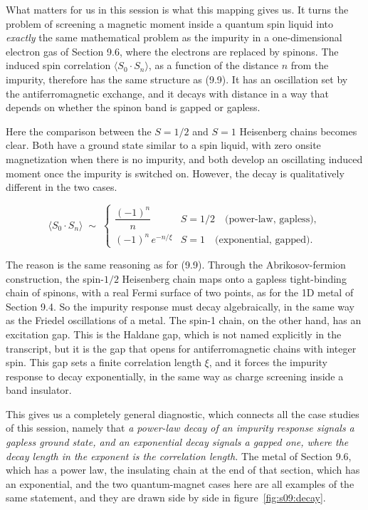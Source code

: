 What matters for us in this session is what this mapping gives us. It turns the problem of screening
a magnetic moment inside a quantum spin liquid into \emph{exactly} the same mathematical problem as
the impurity in a one-dimensional electron gas of Section 9.6, where the electrons are replaced by
spinons. The induced spin correlation $\langle S_0 \cdot S_n\rangle$, as a function of the distance
$n$ from the impurity, therefore has the same structure as (9.9). It has an oscillation set by the
antiferromagnetic exchange, and it decays with distance in a way that depends on whether the spinon
band is gapped or gapless.

Here the comparison between the $S=1/2$ and $S=1$ Heisenberg chains becomes clear. Both have a ground
state similar to a spin liquid, with zero onsite magnetization when there is no impurity, and both
develop an oscillating induced moment once the impurity is switched on. However, the decay is
qualitatively different in the two cases.

\begin{equation}
\langle S_0 \cdot S_n \rangle \;\sim\;
\begin{cases}
\dfrac{(-1)^n}{n} & S = 1/2 \quad \text{(power-law, gapless)}, \\[6pt]
(-1)^n\, e^{-n/\xi} & S = 1 \quad \text{(exponential, gapped)}.
\end{cases}
\end{equation}

The reason is the same reasoning as for (9.9). Through the Abrikosov-fermion construction, the
spin-$1/2$ Heisenberg chain maps onto a gapless tight-binding chain of spinons, with a real Fermi
surface of two points, as for the 1D metal of Section 9.4. So the impurity response must decay
algebraically, in the same way as the Friedel oscillations of a metal. The spin-1 chain, on the other
hand, has an excitation gap. This is the Haldane gap, which is not named explicitly in the
transcript, but it is the gap that opens for antiferromagnetic chains with integer spin. This
gap sets a finite correlation length $\xi$, and it forces the impurity response to decay
exponentially, in the same way as charge screening inside a band insulator.

This gives us a completely general diagnostic, which connects all the case studies of this session,
namely that \emph{a power-law decay of an impurity response signals a gapless ground state, and an
exponential decay signals a gapped one, where the decay length in the exponent is the correlation
length.} The metal of Section 9.6, which has a power law, the insulating chain at the end of that
section, which has an exponential, and the two quantum-magnet cases here are all examples of the same
statement, and they are drawn side by side in figure~\ref{fig:s09:decay}.

